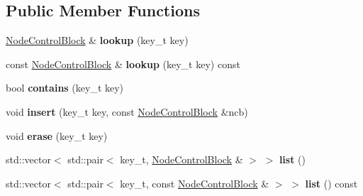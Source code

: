 \subsection*{Public Member Functions}
\begin{DoxyCompactItemize}
\item 
\mbox{\label{class_hash_octree_1_1_unordered_map_lookup_method_a560f0e43cc7ea959ebf3e7dcd1231835}} 
\mbox{\hyperlink{class_hash_octree_1_1_node_control_block}{Node\+Control\+Block}} \& {\bfseries lookup} (key\+\_\+t key)
\item 
\mbox{\label{class_hash_octree_1_1_unordered_map_lookup_method_a8f1e5885252bc270c50cf10e446763bb}} 
const \mbox{\hyperlink{class_hash_octree_1_1_node_control_block}{Node\+Control\+Block}} \& {\bfseries lookup} (key\+\_\+t key) const
\item 
\mbox{\label{class_hash_octree_1_1_unordered_map_lookup_method_ae61323460ad01a4d01d2a01af96a92f9}} 
bool {\bfseries contains} (key\+\_\+t key)
\item 
\mbox{\label{class_hash_octree_1_1_unordered_map_lookup_method_a763d5fdba99d023d3e52391f289b6ffb}} 
void {\bfseries insert} (key\+\_\+t key, const \mbox{\hyperlink{class_hash_octree_1_1_node_control_block}{Node\+Control\+Block}} \&ncb)
\item 
\mbox{\label{class_hash_octree_1_1_unordered_map_lookup_method_af51ef5a8ca00c199f23ba2f2c5a85213}} 
void {\bfseries erase} (key\+\_\+t key)
\item 
\mbox{\label{class_hash_octree_1_1_unordered_map_lookup_method_ab69aaa6761876050f5ddcb59c5104707}} 
std\+::vector$<$ std\+::pair$<$ key\+\_\+t, \mbox{\hyperlink{class_hash_octree_1_1_node_control_block}{Node\+Control\+Block}} \& $>$ $>$ {\bfseries list} ()
\item 
\mbox{\label{class_hash_octree_1_1_unordered_map_lookup_method_ae7b2feb9f6ddfe64ad5b1498a9e45319}} 
std\+::vector$<$ std\+::pair$<$ key\+\_\+t, const \mbox{\hyperlink{class_hash_octree_1_1_node_control_block}{Node\+Control\+Block}} \& $>$ $>$ {\bfseries list} () const
\end{DoxyCompactItemize}


